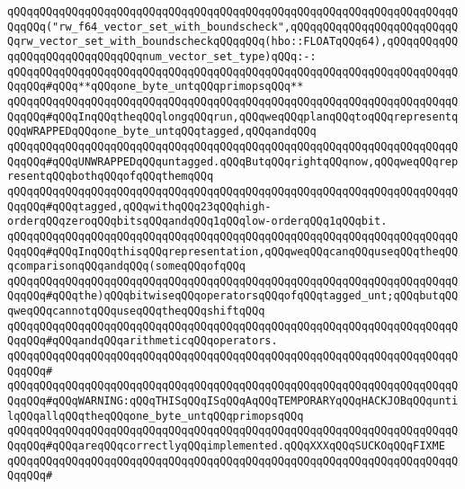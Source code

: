 \verb|qQQqqQQqqQQqqQQqqQQqqQQqqQQqqQQqqQQqqQQqqQQqqQQqqQQqqQQqqQQqqQQqqQQqqQQqqQQq("rw_f64_vector_set_with_boundscheck",qQQqqQQqqQQqqQQqqQQqqQQqqQQqrw_vector_set_with_boundscheckqQQqqQQq(hbo::FLOATqQQq64),qQQqqQQqqQQqqQQqqQQqqQQqqQQqqQQqnum_vector_set_type)qQQq:-:|\newline
\newline
\verb|qQQqqQQqqQQqqQQqqQQqqQQqqQQqqQQqqQQqqQQqqQQqqQQqqQQqqQQqqQQqqQQqqQQqqQQqqQQq#qQQq**qQQqone_byte_untqQQqprimopsqQQq**|\newline
\newline
\newline
\verb|qQQqqQQqqQQqqQQqqQQqqQQqqQQqqQQqqQQqqQQqqQQqqQQqqQQqqQQqqQQqqQQqqQQqqQQqqQQq#qQQqInqQQqtheqQQqlongqQQqrun,qQQqweqQQqplanqQQqtoqQQqrepresentqQQqWRAPPEDqQQqone_byte_untqQQqtagged,qQQqandqQQq|\newline
\verb|qQQqqQQqqQQqqQQqqQQqqQQqqQQqqQQqqQQqqQQqqQQqqQQqqQQqqQQqqQQqqQQqqQQqqQQqqQQq#qQQqUNWRAPPEDqQQquntagged.qQQqButqQQqrightqQQqnow,qQQqweqQQqrepresentqQQqbothqQQqofqQQqthemqQQq|\newline
\verb|qQQqqQQqqQQqqQQqqQQqqQQqqQQqqQQqqQQqqQQqqQQqqQQqqQQqqQQqqQQqqQQqqQQqqQQqqQQq#qQQqtagged,qQQqwithqQQq23qQQqhigh-orderqQQqzeroqQQqbitsqQQqandqQQq1qQQqlow-orderqQQq1qQQqbit.|\newline
\verb|qQQqqQQqqQQqqQQqqQQqqQQqqQQqqQQqqQQqqQQqqQQqqQQqqQQqqQQqqQQqqQQqqQQqqQQqqQQq#qQQqInqQQqthisqQQqrepresentation,qQQqweqQQqcanqQQquseqQQqtheqQQqcomparisonqQQqandqQQq(someqQQqofqQQq|\newline
\verb|qQQqqQQqqQQqqQQqqQQqqQQqqQQqqQQqqQQqqQQqqQQqqQQqqQQqqQQqqQQqqQQqqQQqqQQqqQQq#qQQqthe)qQQqbitwiseqQQqoperatorsqQQqofqQQqtagged_unt;qQQqbutqQQqweqQQqcannotqQQquseqQQqtheqQQqshiftqQQq|\newline
\verb|qQQqqQQqqQQqqQQqqQQqqQQqqQQqqQQqqQQqqQQqqQQqqQQqqQQqqQQqqQQqqQQqqQQqqQQqqQQq#qQQqandqQQqarithmeticqQQqoperators.|\newline
\verb|qQQqqQQqqQQqqQQqqQQqqQQqqQQqqQQqqQQqqQQqqQQqqQQqqQQqqQQqqQQqqQQqqQQqqQQqqQQq#|\newline
\verb|qQQqqQQqqQQqqQQqqQQqqQQqqQQqqQQqqQQqqQQqqQQqqQQqqQQqqQQqqQQqqQQqqQQqqQQqqQQq#qQQqWARNING:qQQqTHISqQQqISqQQqAqQQqTEMPORARYqQQqHACKJOBqQQquntilqQQqallqQQqtheqQQqone_byte_untqQQqprimopsqQQq|\newline
\verb|qQQqqQQqqQQqqQQqqQQqqQQqqQQqqQQqqQQqqQQqqQQqqQQqqQQqqQQqqQQqqQQqqQQqqQQqqQQq#qQQqareqQQqcorrectlyqQQqimplemented.qQQqXXXqQQqSUCKOqQQqFIXME|\newline
\verb|qQQqqQQqqQQqqQQqqQQqqQQqqQQqqQQqqQQqqQQqqQQqqQQqqQQqqQQqqQQqqQQqqQQqqQQqqQQq#|\newline
